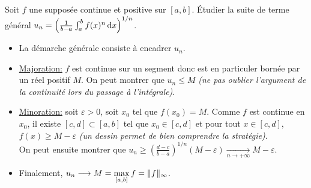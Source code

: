  \begin{exercice}
    Soit $f$ une supposée continue et positive sur $[a, b]$. Étudier la suite de terme général $u_n = \left( \frac{1}{b-a} \int_{a}^{b} f(x)^n \, \mathrm{d} x \right)^{1/n}$.
 \end{exercice}

\begin{elem_sol}
    \begin{itemize}
        \item La démarche générale consiste à encadrer $u_n$. 
        \item \underline{Majoration:} $f$ est continue sur un segment donc est en particuler bornée par un réel positif $M$. On peut montrer que $u_n \leqslant M$ \emph{(ne pas oublier l'argument de la continuité lors du passage à l'intégrale)}.
        \item \underline{Minoration:} soit $\varepsilon > 0$, soit $x_0$ tel que $f(x_0) = M$. Comme $f$ est continue en $x_0$, il existe $[c, d] \subset [a, b]$ tel que $x_0 \in [c, d]$ et pour tout $x \in [c, d]$, $f(x) \geqslant M - \varepsilon$ \emph{(un dessin permet de bien comprendre la stratégie)}.\\
        On peut ensuite montrer que $u_n \geqslant \left(\frac{d-c}{b-a} \right)^{1/n}(M-\varepsilon) \xrightarrow[n \to + \infty]{} M-\varepsilon$.
        \item Finalement, $u_n \displaystyle \longrightarrow M = \max_{[ a, b ]} f = \Vert f \Vert_\infty$.
    \end{itemize}
\end{elem_sol}
